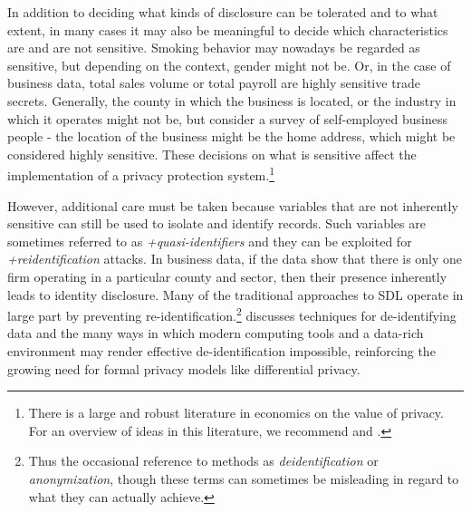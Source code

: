 \documentclass[
]{WileySix}
\begin{document}
In addition to deciding what kinds of disclosure can be tolerated and to what extent, in many cases it may also be meaningful to decide which characteristics are and are not sensitive. Smoking behavior may nowadays be regarded as sensitive, but depending on the context, gender might not be. Or, in the case of business data, total sales volume or total payroll are highly sensitive trade secrets. Generally, the county in which the business is located, or the industry in which it operates might not be, but consider a survey of self-employed business people - the location of the business might be the home address, which might be considered highly sensitive. These decisions on what is sensitive affect the implementation of a privacy protection system.\footnote{There is a large and robust literature in economics on the value of privacy. For an overview of ideas in this literature, we recommend \citet{varian_economic_2002} and \citet{acquisti_economics_2016}.}

However, additional care must be taken because variables that are not inherently sensitive can still be used to isolate and identify records. Such variables are sometimes referred to as \emph{+quasi-identifiers\textbar{}} and they can be exploited for \emph{+reidentification\textbar{}} attacks. In business data, if the data show that there is only one firm operating in a particular county and sector, then their presence inherently leads to identity disclosure. Many of the traditional approaches to SDL operate in large part by preventing re-identification.\footnote{Thus the occasional reference to methods as \emph{deidentification} or \emph{anonymization}, though these terms can sometimes be misleading in regard to what they can actually achieve.} \citet{garfinkel_-identification_2015} discusses techniques for de-identifying data and the many ways in which modern computing tools and a data-rich environment may render effective de-identification impossible, reinforcing the growing need for formal privacy models like differential privacy.
\end{document}
